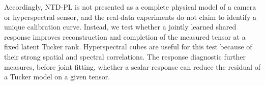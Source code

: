 Accordingly, NTD-PL is not presented as a complete physical model of a camera
or hyperspectral sensor, and the real-data experiments do not claim to identify
a unique calibration curve. Instead, we test whether a jointly learned shared
response improves reconstruction and completion of the measured tensor at a
fixed latent Tucker rank. Hyperspectral cubes are useful for this test because
of their strong spatial and spectral correlations. The response diagnostic
further measures, before joint fitting, whether a scalar response can reduce
the residual of a Tucker model on a given tensor.
